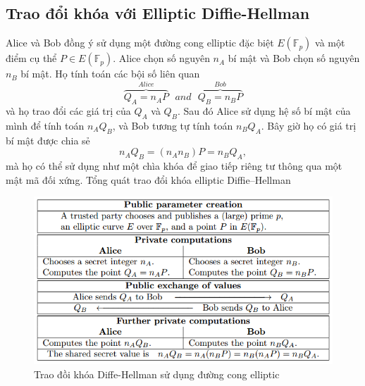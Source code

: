 \documentclass[a4paper,12pt]{report}
\begin{document}
\subsection*{Trao đổi khóa với Elliptic Diffie-Hellman}
Alice và Bob đồng ý sử dụng một đường cong elliptic đặc biệt $E(\mathbb{F}_p)$ và một điểm cụ thể $P \in E(\mathbb{F}_p)$. Alice chọn số nguyên $n_A$ bí mật và Bob chọn số nguyên $n_B$ bí mật. Họ tính toán các bội số liên quan
\begin{displaymath}
\overbrace{Q_A = n_AP}^{Alice} \ \ \ and \ \ \ \overbrace{Q_B = n_BP}^{Bob}
\end{displaymath}
và họ trao đổi các giá trị của $Q_A$ và $Q_B$. Sau đó Alice sử dụng hệ số bí mật của mình để tính toán $n_AQ_B$, và Bob tương tự tính toán $n_BQ_A$. Bây giờ họ có giá trị bí mật được chia sẻ
\begin{displaymath}
n_AQ_B = (n_An_B)P = n_BQ_A,
\end{displaymath}
mà họ có thể sử dụng như một chìa khóa để giao tiếp riêng tư thông qua một mật mã đối xứng. Tổng quát trao đổi khóa elliptic Diffie–Hellman
\begin{figure}[H]
\begin{center}
\includegraphics[scale=0.9]{../im7.png}
\caption{Trao đồi khóa Diffe-Hellman sử dụng đường cong elliptic}
\end{center}
\end{figure}
\end{document}
